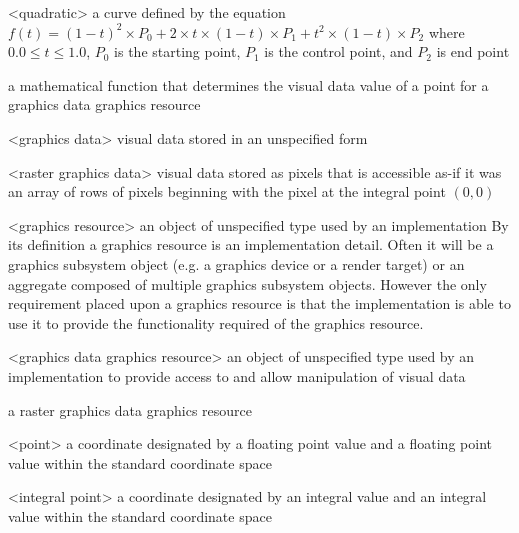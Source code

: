 <quadratic> a curve defined by the 
equation $f(t) = (1 - t)^{2} \times P_{0} + 2 \times t \times (1 - t) 
\times P_{1} + t^{2} \times (1 - t) \times P_{2}$ 
where $0.0 \le t \le 1.0$, $P_{0}$ is the starting point, $P_{1}$ is the 
control point, and $P_{2}$ is end point

a mathematical function that determines the visual data value of a point for a graphics data graphics resource

<graphics data> visual data stored in an unspecified form

<raster graphics data> visual data stored as pixels that is accessible as-if it was an array of rows of pixels beginning with the pixel at the integral point $(0,0)$

<graphics resource> an object of unspecified type used by an implementation
\enternote
By its definition a graphics resource is an implementation detail. Often it will be a graphics subsystem object (e.g. a graphics device or a render target) or an aggregate composed of multiple graphics subsystem objects. However the only requirement placed upon a graphics resource is that the implementation is able to use it to provide the functionality required of the graphics resource.
\exitnote

<graphics data graphics resource> an object of unspecified type used by an implementation to provide access to and allow manipulation of visual data

\indexdefn{\pixmap}
a raster graphics data graphics resource

<point> a coordinate designated by a floating point \xaxis{} value and a floating point \yaxis{} value within the standard coordinate space

<integral point> a coordinate designated by an integral \xaxis{} value and an integral \yaxis{} value within the standard coordinate space


